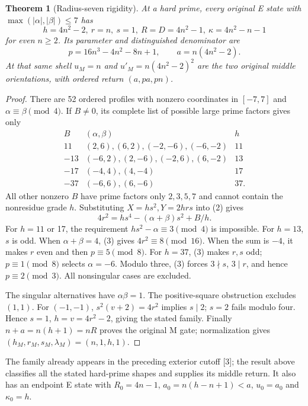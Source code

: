 \documentclass[11pt,reqno]{amsart}
\newtheorem{theorem}{Theorem}\newtheorem{lemma}[theorem]{Lemma}
\begin{document}
\begin{theorem}[Radius-seven rigidity]
At a hard prime, every original E state with $\max(|\alpha|,|\beta|)\le7$ has
\[
 h=4n^2-2,\ r=n,\ s=1,\ R=D=4n^2-1,\ \kappa=4n^2-n-1
\]
for even $n\ge2$. Its parameter and distinguished denominator are
\[
 p=16n^3-4n^2-8n+1,\qquad a=n(4n^2-2).
\]
At that same shell $u_M=n$ and $u'_M=n(4n^2-2)^2$ are the two original
middle orientations, with ordered return $(a,pa,pn)$.
\end{theorem}
\begin{proof}
There are 52 ordered profiles with nonzero coordinates in $[-7,7]$ and
$\alpha\equiv\beta\pmod4$. If $B\ne0$, its complete list of possible large
prime factors gives only
\[
\begin{array}{c|c|c}
B& (\alpha,\beta)&h\\\hline
11&(2,6),(6,2),(-2,-6),(-6,-2)&11\\
-13&(-6,2),(2,-6),(-2,6),(6,-2)&13\\
-17&(-4,4),(4,-4)&17\\
-37&(-6,6),(6,-6)&37.
\end{array}
\]
All other nonzero $B$ have prime factors only $2,3,5,7$ and cannot contain the
nonresidue grade $h$. Substituting $X=hs^2,Y=2hrs$ into (2) gives
\[
 4r^2=hs^4-(\alpha+\beta)s^2+B/h.                         \tag{3}
\]
For $h=11$ or 17, the requirement $hs^2-\alpha\equiv3\pmod4$ is impossible.
For $h=13$, $s$ is odd. When $\alpha+\beta=4$, (3) gives $4r^2\equiv8\pmod{16}$.
When the sum is $-4$, it makes $r$ even and then $p\equiv5\pmod8$.
For $h=37$, (3) makes $r,s$ odd; $p\equiv1\pmod8$ selects $\alpha=-6$.
Modulo three, (3) forces $3\nmid s$, $3\mid r$, and hence $p\equiv2\pmod3$.
All nonsingular cases are excluded.

The singular alternatives have $\alpha\beta=1$. The positive-square obstruction
excludes $(1,1)$. For $(-1,-1)$, $s^2(v+2)=4r^2$ implies $s\mid2$;
$s=2$ fails modulo four. Hence $s=1$, $h=v=4r^2-2$, giving the stated family.
Finally $n+a=n(h+1)=nR$ proves the original M gate; normalization gives
$(h_M,r_M,s_M,\lambda_M)=(n,1,h,1)$.
\end{proof}

The family already appears in the preceding exterior cutoff [3]; the result
above classifies all the stated hard-prime shapes and supplies its middle return.
It also has an endpoint E state with $R_0=4n-1$, $a_0=n(h-n+1)<a$, $u_0=a_0$
and $\kappa_0=h$.
\end{document}
